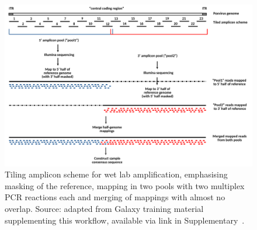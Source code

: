 \begin{figure}[ht!]
    \centering
    \hspace*{-8pt}
    \includegraphics[width=1.1\textwidth]{media/4-pox-ampl-fig.png}
    \caption[Tiling amplicon scheme used in poxvirus workflow.]{Tiling amplicon scheme for wet lab amplification, emphasising masking of the reference, mapping in two pools with two multiplex PCR reactions each and merging of mappings with almost no overlap. Source: adapted from Galaxy training material supplementing this workflow, available via link in Supplementary~.}
    \label{fig:3-pox-ampl}
\end{figure}

